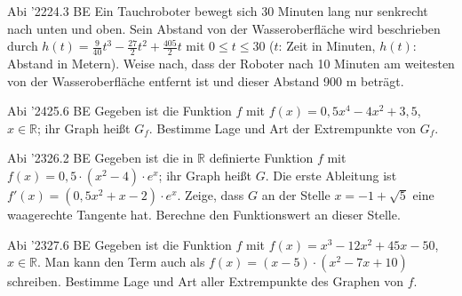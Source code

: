 \documentclass[11pt]{article}
\begin{document}
\pfgruppe{}
\begin{pfaufg}{Abi ’22}{24.}{3 BE}
Ein Tauchroboter bewegt sich 30 Minuten lang nur senkrecht nach unten und oben. Sein Abstand von der Wasseroberfläche wird beschrieben durch $h(t) = \tfrac{9}{40}t^3 - \tfrac{27}{2}t^2 + \tfrac{405}{2}t$ mit $0 \le t \le 30$ ($t$: Zeit in Minuten, $h(t)$: Abstand in Metern). Weise nach, dass der Roboter nach 10 Minuten am weitesten von der Wasseroberfläche entfernt ist und dieser Abstand 900 m beträgt.
\par\smallskip\noindent {}\par
{}
\end{pfaufg}
\pfgruppe{}
\begin{pfaufg}{Abi ’24}{25.}{6 BE}
Gegeben ist die Funktion $f$ mit $f(x) = 0{,}5x^4 - 4x^2 + 3{,}5$, $x \in \mathbb{R}$; ihr Graph heißt $G_f$. Bestimme Lage und Art der Extrempunkte von $G_f$.
\end{pfaufg}
\pfgruppe{}
\begin{pfaufg}{Abi ’23}{26.}{2 BE}
Gegeben ist die in $\mathbb{R}$ definierte Funktion $f$ mit $f(x) = 0{,}5\cdot(x^2 - 4)\cdot e^x$; ihr Graph heißt $G$. Die erste Ableitung ist $f'(x) = (0{,}5x^2 + x - 2)\cdot e^x$. Zeige, dass $G$ an der Stelle $x = -1 + \sqrt{5}$ eine waagerechte Tangente hat. Berechne den Funktionswert an dieser Stelle.
\end{pfaufg}
\pfgruppe{}
\begin{pfaufg}{Abi ’23}{27.}{6 BE}
Gegeben ist die Funktion $f$ mit $f(x) = x^3 - 12x^2 + 45x - 50$, $x \in \mathbb{R}$. Man kann den Term auch als $f(x) = (x - 5)\cdot(x^2 - 7x + 10)$ schreiben. Bestimme Lage und Art aller Extrempunkte des Graphen von $f$.
\end{pfaufg}
\end{document}
